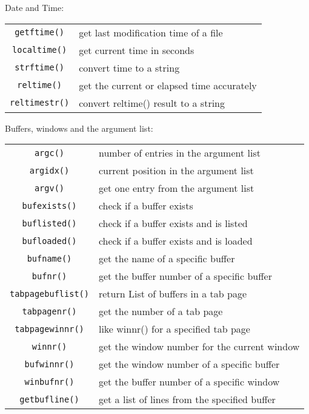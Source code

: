 Date and Time:
\label{date-functions}
\label{time-functions}
\begin{center} \begin{tabular}{c l}
				\verb!getftime()! & get last modification time of a file \\
				\verb!localtime()! & get current time in seconds \\
				\verb!strftime()! & convert time to a string \\
				\verb!reltime()! & get the current or elapsed time accurately \\
				\verb!reltimestr()! & convert reltime() result to a string \\
\end{tabular} \end{center}

Buffers, windows and the argument list:
\label{buffer-functions}
\label{window-functions}
\label{arg-functions}
\begin{center} \begin{tabular}{c l}
				\verb!argc()! & number of entries in the argument list \\
				\verb!argidx()! & current position in the argument list \\
				\verb!argv()! & get one entry from the argument list \\
				\verb!bufexists()! & check if a buffer exists \\
				\verb!buflisted()! & check if a buffer exists and is listed \\
				\verb!bufloaded()! & check if a buffer exists and is loaded \\
				\verb!bufname()! & get the name of a specific buffer \\
				\verb!bufnr()! & get the buffer number of a specific buffer \\
				\verb!tabpagebuflist()! & return List of buffers in a tab page \\
				\verb!tabpagenr()! & get the number of a tab page \\
				\verb!tabpagewinnr()! & like winnr() for a specified tab page \\
				\verb!winnr()! & get the window number for the current window \\
				\verb!bufwinnr()! & get the window number of a specific buffer \\
				\verb!winbufnr()! & get the buffer number of a specific window \\
				\verb!getbufline()! & get a list of lines from the specified buffer \\
\end{tabular} \end{center}

